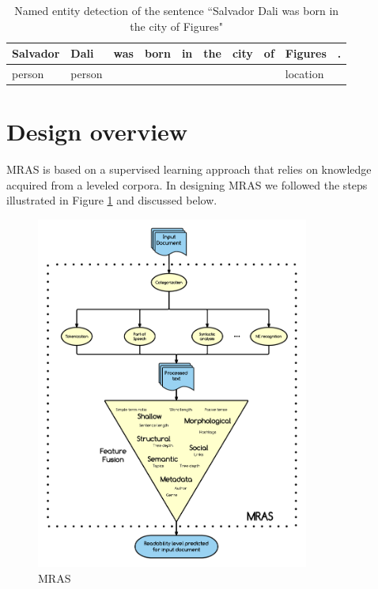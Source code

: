 \documentclass{bsu-ms}
\newcommand{\projectName}{MRAS\xspace}
\begin{document}
\begin{table}[h]
\centering
\begin{tabular}{|l|l|l|l|l|l|l|l|l|l|}
\hline
Salvador & Dali & was & born & in & the & city & of & Figures & . \\ \hline
person & person &   &   &   &   &  &  & location &   \\ \hline
\end{tabular}
\caption{Named entity detection of the sentence ``Salvador Dali was born in the city of Figures"}
\label{tab:postagging}
\end{table}


\section{Design overview}
\label{sec:overview}





\projectName is based on a supervised learning approach that relies on knowledge acquired from a leveled corpora. In designing \projectName we followed the steps illustrated in Figure \ref{fig:pipeline} and discussed below.



\begin{figure}[h!]
\centering
\includegraphics[width=0.8\textwidth]{pipelineGraph}
\caption{\projectName}
\label{fig:pipeline}
\end{figure}
\end{document}

